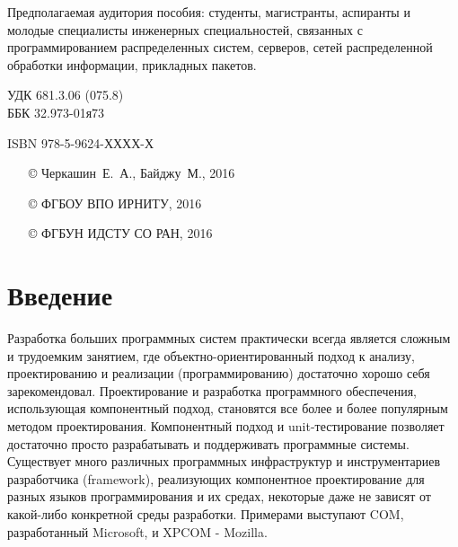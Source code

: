 \documentclass[14pt,a4paper,openany,twoside,final]{extbook}
\newcommand\e[1]{#1}
\begin{document}
\begin{mygroup}
\begin{minipage}[t]{0.95\linewidth}
Предполагаемая аудитория пособия: студенты, магистранты, аспиранты и молодые специалисты инженерных специальностей, связанных с программированием распределенных систем, серверов, сетей распределенной обработки информации, прикладных пакетов.

\mbox{}
\endgroup
\end{minipage}
\mbox{}\hspace{0.7\linewidth}
\begin{minipage}{0.3\linewidth}\small
\noindent УДК 681.3.06 (075.8)\\
\noindent ББК 32.973-01я73
\end{minipage}

\vfill
\noindent\begin{minipage}[t]{0.35\linewidth}\small
\noindent \e{ISBN 978-5-9624-ХХХХ-Х}
\end{minipage}%
\begin{minipage}[t]{0.65\linewidth}\small
\begin{itemize}
\setlength{\itemsep}{-0.5ex}
\setlength{\parsep}{0pt}
\item[\copyright{}] Черкашин~Е.~А., Байджу~М., 2016
\item[\copyright{}] ФГБОУ ВПО ИРНИТУ, 2016
\item[\copyright{}] ФГБУН ИДСТУ СО РАН, 2016
\end{itemize}
\end{minipage}
\end{mygroup}
\newpage{}
\label{contents}
\tableofcontents



\chapter{Введение%
  \label{id1}%
}



Разработка больших программных систем практически всегда является
сложным и трудоемким занятием, где объектно-ориентированный подход к
анализу, проектированию и реализации (программированию) достаточно
хорошо себя зарекомендовал.  Проектирование и разработка программного
обеспечения, использующая компонентный подход, становятся все более и
более популярным методом проектирования.  Компонентный подход и
unit-тестирование позволяет достаточно просто разрабатывать и
поддерживать программные системы.  Существует много различных
программных инфраструктур и инструментариев разработчика (framework),
реализующих компонентное проектирование для разных языков
программирования и их средах, некоторые даже не зависят от какой-либо
конкретной среды разработки.  Примерами выступают COM, разработанный
Microsoft, и XPCOM - Mozilla.
\end{document}
